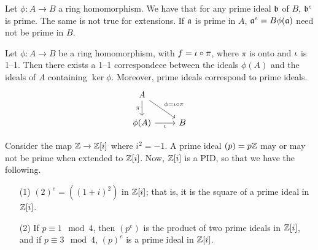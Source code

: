 \begin{example}\label{example_1.16}
    Let $\phi:A \xrightarrow{} B$ a ring homomorphism. We have that for any prime
    ideal $\bf$ of $B$, $\bf^c$ is prime. The same is not true for extensions.
    If $\af$ is prime in $A$,  $\af^e=B\phi(\af)$ need not be prime in $B$.
\end{example}

\begin{lemma}\label{1.10.3}
    Let $\phi:A \xrightarrow{} B$ be a ring homomorphism, with $f=\i \circ \pi$,
    where  $\pi$ is onto and  $\i$ is 1--1. Then there exists a 1--1
    correspondece between the ideals $\phi(A)$ and the ideals of $A$ containing
     $\ker{\phi}$. Moreover, prime ideals correspond to prime ideals.
     \[\begin{tikzcd}
        A \\
        {\phi(A)} & B
        \arrow["\pi"', from=1-1, to=2-1]
        \arrow["\iota"', from=2-1, to=2-2]
        \arrow["{\phi=\iota \circ \pi}", from=1-1, to=2-2]
      \end{tikzcd}\]
\end{lemma}

\begin{example}\label{example_1.17}
    Consider the map $\Z \xrightarrow{} \Z[i]$ where $i^2=-1$. A prime ideal
    $(p)=p\Z$ may or may not be prime when extended to $\Z[i]$. Now, $\Z[i]$ is
        a PID, so that we have the following.
        \begin{enumerate}
            \item[(1)] $(2)^e=((1+i)^2)$ in $\Z[i]$; that is, it is the square
                of a prime ideal in $\Z[i]$.

            \item[(2)] If $p \equiv 1 \mod{4}$, then $(p^e)$ is the product of
                two prime ideals in $\Z[i]$, and if $p \equiv 3 \mod{4}$,
                $(p)^e$ is a prime ideal in $\Z[i]$.
        \end{enumerate}
\end{example}

